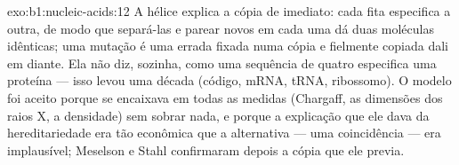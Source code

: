 \begin{solution}{exo:b1:nucleic-acids:12}
A hélice explica a cópia de imediato: cada fita especifica a outra, de
modo que separá-las e parear  novos em cada uma dá duas
moléculas idênticas; uma mutação é uma  errada fixada numa cópia e
fielmente copiada dali em diante. Ela não diz, sozinha, como uma
sequência de quatro  especifica uma proteína --- isso levou uma
década (código, mRNA, tRNA, ribossomo). O modelo foi aceito porque se
encaixava em todas as medidas (Chargaff, as dimensões dos raios X, a
densidade) sem sobrar nada, e porque a explicação que ele dava da
hereditariedade era tão econômica que a alternativa --- uma coincidência
--- era implausível; Meselson e Stahl confirmaram depois a cópia que ele
previa.
\end{solution}

